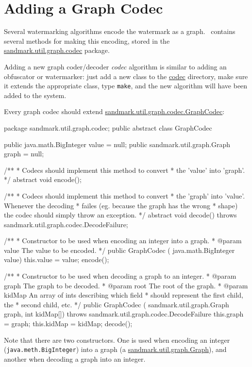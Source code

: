\section{Adding a Graph Codec}
\label{AddingCodecs}
Several watermarking algorithms encode the
watermark as a graph. \SM\ contains several
methods for making this encoding, stored in
the \url{sandmark.util.graph.codec} package.

Adding a new graph coder/decoder {\em codec}
algorithm is similar to adding an obfuscator
or watermarker: just add a new class to
the \url{codec} directory, make sure it
extends the appropriate class, type {\tt make},
and the new algorithm will have been added to
the system.

Every graph codec should extend \url{sandmark.util.graph.codec.GraphCodec}:
\begin{listing}{1}
package sandmark.util.graph.codec;
public abstract class GraphCodec {
   public java.math.BigInteger value = null;
   public sandmark.util.graph.Graph graph = null;

/**
 * Codecs should implement this method to convert
 * the 'value' into 'graph'.
 */ 
   abstract void encode();

/**
 * Codecs should implement this method to convert
 * the 'graph' into 'value'. Whenever the decoding
 * failes (eg. because the graph has the wrong
 * shape) the codec should simply throw an exception.
 */ 
   abstract void decode() throws sandmark.util.graph.codec.DecodeFailure;

/**
 * Constructor to be used when encoding an integer into a graph.
 *   @param value   The value to be encoded.
 */ 
   public GraphCodec (
       java.math.BigInteger value) {
       this.value = value;
       encode();
   }

/**
 * Constructor to be used when decoding a graph to an integer.
 *   @param graph   The graph to be decoded.
 *   @param root    The root of the graph.
 *   @param kidMap  An array of ints describing which field
 *                  should represent the first child, the
 *                  second child, etc.
 */ 
   public GraphCodec (
       sandmark.util.graph.Graph graph, 
       int kidMap[]) throws sandmark.util.graph.codec.DecodeFailure {
       this.graph = graph;
       this.kidMap = kidMap;
       decode();
   }
}
\end{listing}
Note that there are two constructors. One is used when
encoding an integer ({\tt java.meth.BigInteger})
into a graph (a \url{sandmark.util.graph.Graph}), and another when
decoding a graph into an integer.

